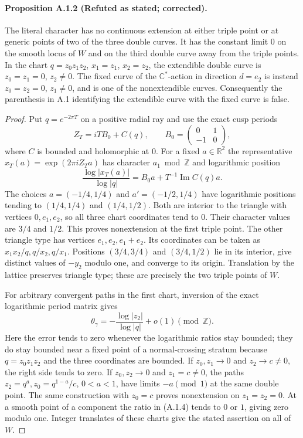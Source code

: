 \paragraph{Proposition A.1.2 (Refuted as stated; corrected).}
The literal character has no continuous extension at either
triple point or at generic points of two of the three double
curves.  It has the constant limit $0$ on the smooth locus of
$W$ and on the third double curve away from the triple points.
In the chart $q=z_0z_1z_2$, $x_1=z_1$, $x_2=z_2$, the extendible
double curve is $z_0=z_1=0$, $z_2\ne0$.  The fixed curve of the
$\mathbb C^*$-action in direction $d=e_2$ is instead
$z_0=z_2=0$, $z_1\ne0$, and is one of the nonextendible curves.
Consequently the parenthesis in A.1 identifying the extendible
curve with the fixed curve is false.

\begin{proof}
Put $q=e^{-2\pi T}$ on a positive radial ray and use the exact
cusp periods
\[
 Z_T=iTB_0+C(q),\qquad
 B_0=\begin{pmatrix}0&1\\-1&0\end{pmatrix},
\]
where $C$ is bounded and holomorphic at $0$.  For a fixed
$a\in\mathbb R^2$ the representative
$x_T(a)=\exp(2\pi iZ_Ta)$ has character $a_1\bmod\mathbb Z$ and
logarithmic position
\[
 \frac{\log|x_T(a)|}{\log|q|}
 =B_0a+T^{-1}\operatorname{Im}C(q)a.
 \tag{A.1.3}
\]
The choices $a=(-1/4,1/4)$ and $a'=(-1/2,1/4)$ have logarithmic
positions tending to $(1/4,1/4)$ and $(1/4,1/2)$.
Both are interior to the triangle with vertices $0,e_1,e_2$,
so all three chart coordinates tend to $0$.  Their character
values are $3/4$ and $1/2$.  This proves nonextension at the
first triple point.  The other triangle type has vertices
$e_1,e_2,e_1+e_2$.  Its coordinates can be taken as
$x_1x_2/q,q/x_2,q/x_1$.  Positions $(3/4,3/4)$ and
$(3/4,1/2)$ lie in its interior, give distinct values of $-y_2$
modulo one, and converge to its origin.  Translation by the
lattice preserves triangle type; these are precisely the two
triple points of $W$.

For arbitrary convergent paths in the first chart, inversion
of the exact logarithmic period matrix gives
\[
 \theta_\gamma=-\frac{\log|z_2|}{\log|q|}+o(1)\pmod{\mathbb Z}.
 \tag{A.1.4}
\]
Here the error tends to zero whenever the logarithmic ratios
stay bounded; they do stay bounded near a fixed point of a
normal-crossing stratum because $q=z_0z_1z_2$ and the three
coordinates are bounded.  If $z_0,z_1\to0$ and $z_2\to c\ne0$,
the right side tends to zero.  If $z_0,z_2\to0$ and $z_1=c\ne0$,
the paths $z_2=q^a,z_0=q^{1-a}/c$, $0<a<1$, have limits
$-a\pmod1$ at the same double point.  The same construction
with $z_0=c$ proves nonextension on $z_1=z_2=0$.
At a smooth point of a component the ratio in (A.1.4) tends
to $0$ or $1$, giving zero modulo one.  Integer translates
of these charts give the stated assertion on all of $W$.


\end{proof}
